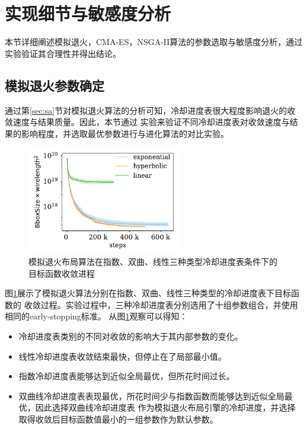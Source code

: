 \section{实现细节与敏感度分析}

本节详细阐述模拟退火，CMA-ES，NSGA-II算法的参数选取与敏感度分析，通过实验验证其合理性并得出结论。

\subsection{模拟退火参数确定}
\label{sec:cooling}

通过第\ref{sec:sa}节对模拟退火算法的分析可知，冷却进度表很大程度影响退火的收敛速度与结果质量。因此，本节通过
实验来验证不同冷却进度表对收敛速度与结果的影响程度，并选取最优参数进行与进化算法的对比实验。

\begin{figure}[h]
	\centering
	\includegraphics[width=0.6\textwidth]{figure/Annealing-Tuning}
	\caption{模拟退火布局算法在指数、双曲、线性三种类型冷却进度表条件下的目标函数收敛进程} 
	\label{fig:annealing-tune}
\end{figure}

图\ref{fig:annealing-tune}展示了模拟退火算法分别在指数、双曲、线性三种类型的冷却进度表下目标函数的
收敛过程。实验过程中，三种冷却进度表分别选用了十组参数组合，并使用相同的early-stopping标准。
从图\ref{fig:annealing-tune}观察可以得知：
\begin{itemize}
    \item 冷却进度表类别的不同对收敛的影响大于其内部参数的变化。
    \item 线性冷却进度表收敛结束最快，但停止在了局部最小值。
    \item 指数冷却进度表能够达到近似全局最优，但所花时间过长。
    \item 双曲线冷却进度表表现最优，所花时间少与指数函数而能够达到近似全局最优，因此选择双曲线冷却进度表
    作为模拟退火布局引擎的冷却进度，并选择取得收敛后目标函数值最小的一组参数作为默认参数。
\end{itemize}


